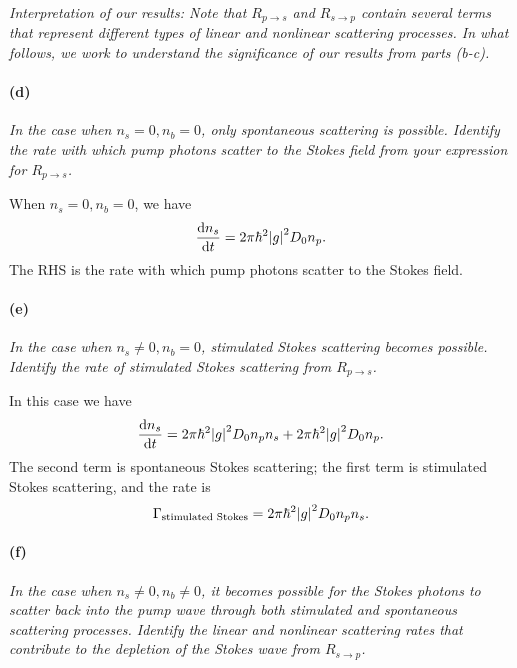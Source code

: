 \documentclass[hyperref, a4paper]{article}
\begin{document}
\textit{
    Interpretation of our results: Note that $R_{p \rightarrow s}$ and $R_{s \rightarrow p}$ contain several terms that represent different types of linear and nonlinear scattering processes. In what follows, we work to understand the significance of our results from parts (b-c).
}

\paragraph*{(d)} \textit{
    In the case when $n_s=0, n_b=0$, only spontaneous scattering is possible. Identify the rate with which pump photons scatter to the Stokes field from your expression for $R_{p \rightarrow s}$.
}

When $n_s = 0, n_b = 0$, we have 
\begin{equation}
    \dv{n_s}{t} = 2 \pi \hbar^2 \abs{g}^2 D_0 n_p.
\end{equation}
The RHS is the rate with which pump photons scatter to the Stokes field.

\paragraph*{(e)} \textit{
    In the case when $n_s \neq 0, n_b=0$, stimulated Stokes scattering becomes possible. Identify the rate of stimulated Stokes scattering from $R_{p \rightarrow s}$.
}

In this case we have 
\begin{equation}
    \dv{n_s}{t} = 2 \pi \hbar^2 \abs{g}^2 D_0 n_p n_s + 2 \pi \hbar^2 \abs{g}^2 D_0 n_p.
\end{equation}
The second term is spontaneous Stokes scattering; 
the first term is stimulated Stokes scattering, and the rate is 
\begin{equation}
    \Gamma_{\text{stimulated Stokes}} = 2 \pi \hbar^2 \abs{g}^2 D_0 n_p n_s .
\end{equation}

\paragraph*{(f)} \textit{
    In the case when $n_s \neq 0, n_b \neq 0$, it becomes possible for the Stokes photons to scatter back into the pump wave through both stimulated and spontaneous scattering processes. Identify the linear and nonlinear scattering rates that contribute to the depletion of the Stokes wave from $R_{s \rightarrow p}$.
}
\end{document}
